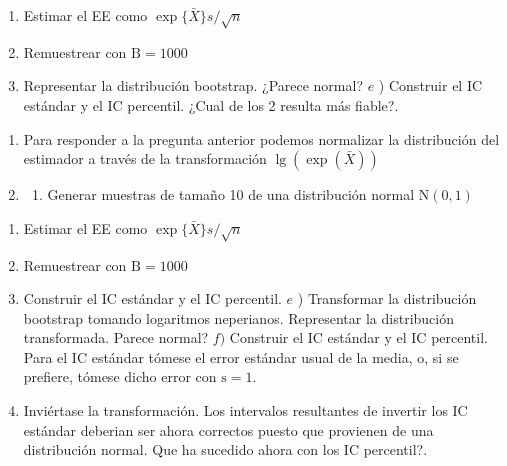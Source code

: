 \documentclass[
]{article}
\providecommand{\tightlist}{%
  \setlength{\itemsep}{0pt}\setlength{\parskip}{0pt}}
\begin{document}
\begin{enumerate}
\def\labelenumi{\alph{enumi})}
\setcounter{enumi}{1}
\tightlist
\item
  Estimar el EE como \(\exp \{\bar{X}\} s / \sqrt{n}\)
\item
  Remuestrear con \(\mathrm{B}=1000\)
\item
  Representar la distribución bootstrap. ¿Parece normal?
  \(e\) ) Construir el IC estándar y el IC percentil. ¿Cual de los 2 resulta más fiable?.
\end{enumerate}

\begin{enumerate}
\def\labelenumi{\arabic{enumi}.}
\setcounter{enumi}{4}
\tightlist
\item
  Para responder a la pregunta anterior podemos normalizar la distribución del estimador a través de la transformación \(\lg (\exp (\bar{X}))\)
\item
  \begin{enumerate}
  \def\labelenumii{\alph{enumii})}
  \tightlist
  \item
    Generar muestras de tamaño 10 de una distribución normal \(\mathrm{N}(0,1)\)
  \end{enumerate}
\end{enumerate}

\begin{enumerate}
\def\labelenumi{\alph{enumi})}
\setcounter{enumi}{1}
\tightlist
\item
  Estimar el EE como \(\exp \{\bar{X}\} s / \sqrt{n}\)
\item
  Remuestrear con \(\mathrm{B}=1000\)
\item
  Construir el IC estándar y el IC percentil.
  \(e\) ) Transformar la distribución bootstrap tomando logaritmos neperianos. Representar la distribución transformada. Parece normal?
  \(f)\) Construir el IC estándar y el IC percentil. Para el IC estándar tómese el error estándar usual de la media, o, si se prefiere, tómese dicho error con \(\mathrm{s}=1\).
\item
  Inviértase la transformación. Los intervalos resultantes de invertir los IC estándar deberian ser ahora correctos puesto que provienen de una distribución normal. Que ha sucedido ahora con los IC percentil?.
\end{enumerate}
\end{document}
